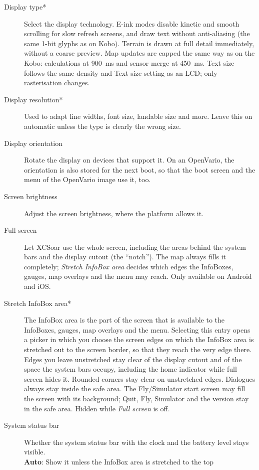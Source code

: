 \begin{description}
\item[Display type*]  Select the display technology. E-ink modes disable
  kinetic and smooth scrolling for slow refresh screens, and draw text
  without anti-aliasing (the same 1-bit glyphs as on Kobo). Terrain is
  drawn at full detail immediately, without a coarse preview. Map
  updates are capped the same way as on the Kobo: calculations at
  900~ms and sensor merge at 450~ms. Text size
  follows the same density and Text size setting as an LCD; only
  rasterisation changes.
\item[Display resolution*]  Used to adapt line widths, font size, landable
  size and more. Leave this on automatic unless the type is clearly
  the wrong size.
\item[Display orientation]  Rotate the display on devices that support it.
  On an OpenVario, the orientation is also stored for the next boot, so
  that the boot screen and the menu of the OpenVario image use it, too.
\item[Screen brightness]  Adjust the screen brightness, where the platform
  allows it.
\item[Full screen]  Let XCSoar use the whole screen, including the areas
  behind the system bars and the display cutout (the ``notch''). The map
  always fills it completely; \emph{Stretch InfoBox area} decides which
  edges
  the InfoBoxes, gauges, map overlays and the menu may reach.
  Only available on Android and iOS.
\item[Stretch InfoBox area*]  The InfoBox area is the part of the screen
  that is available to the InfoBoxes, gauges, map overlays and the
  menu. Selecting
  this entry opens a picker in which you choose the screen edges on which
  the InfoBox area is stretched out to the screen border, so that they
  reach the very edge
  there. Edges you leave unstretched stay clear of the display
  cutout and of the space the system bars occupy, including the
  home indicator while full screen hides it. Rounded corners stay
  clear on unstretched edges. Dialogues always stay inside the
  safe area. The Fly/Simulator start screen may fill the screen
  with its background; Quit, Fly, Simulator and the version stay
  in the safe area.
  Hidden while \emph{Full screen} is off.
\item[System status bar]  Whether the system status bar with the clock and
  the battery level stays visible. \\
  {\bf Auto}: Show it unless the InfoBox area is stretched to the top

\end{description}
